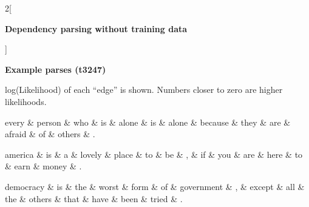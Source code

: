 \documentclass[12pt]{extarticle}
\begin{document}
\begin{multicols*}{2}[
\centerline{\Huge\bf Dependency parsing without training data}
\vspace{2ex}
]
\end{multicols*}



\cleardoublepage
\centerline{\Huge\bf Example parses (t3247)}

\vfill

\centerline{log(Likelihood) of each ``edge'' is shown.  Numbers closer to zero are
higher likelihoods.}

\vfill

\begin{dependency}[theme = simple]
\begin{deptext}[column sep=1em]
     every \& person \& who \& is \& alone \& is \& alone \& because \& they \& are \& afraid \& of \& others \& .  \\
\end{deptext}
\end{dependency}

\begin{dependency}[theme = simple]
\begin{deptext}[column sep=1em]
     america \& is \& a \& lovely \& place \& to \& be \& , \& if \& you \& are \& here \& to \& earn \& money \& .  \\
\end{deptext}
\end{dependency}


\begin{dependency}[theme = simple]
\begin{deptext}[column sep=1em]
     democracy \& is \& the \& worst \& form \& of \& government \& , \& except \& all \& the \& others \& that \& have \& been \& tried \& .  \\
\end{deptext}
\end{dependency}
\end{document}
